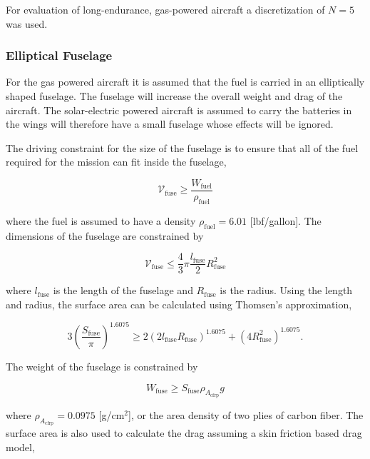     For evaluation of long-endurance, gas-powered aircraft a discretization of $N=5$ was used. 

\subsubsection{Elliptical Fuselage}

For the gas powered aircraft it is assumed that the fuel is carried in an elliptically shaped fuselage.  The fuselage will increase the overall weight and drag of the aircraft.  The solar-electric powered aircraft is assumed to carry the batteries in the wings will therefore have a small fuselage whose effects will be ignored.  

The driving constraint for the size of the fuselage is to ensure that all of the fuel required for the mission can fit inside the fuselage, 

\begin{equation}
    \label{e:fusevol}
    \mathcal{V}_{\text{fuse}} \geq \frac{W_\text{fuel}}{\rho_\text{fuel}}
\end{equation}

where the fuel is assumed to have a density $\rho_\text{fuel} = 6.01$ [lbf/gallon].  The dimensions of the fuselage are constrained by

\begin{equation}
    \label{e:fusevol2}
    \mathcal{V}_{\text{fuse}} \leq \frac{4}{3}\pi \frac{l_{\text{fuse}}}{2}R_{\text{fuse}}^2
\end{equation}

where $l_{\text{fuse}}$ is the length of the fuselage and $R_{\text{fuse}}$ is the radius. Using the length and radius, the surface area can be calculated using Thomsen's approximation,\cite{ellipsoidSA}

\begin{equation}
    \label{e:fusesa}
    3 \left( \frac{S_{\text{fuse}}}{\pi} \right)^{1.6075} \geq 2(2l_{\text{fuse}}R_{\text{fuse}})^{1.6075} + (4R_{\text{fuse}}^2)^{1.6075}.
\end{equation}

The weight of the fuselage is constrained by

\begin{equation}
    \label{e:fuseweight}
    W_{\text{fuse}} \geq S_{\text{fuse}} \rho_{A_{\text{cfrp}}} g
\end{equation} 

where $\rho_{A_{\text{cfrp}}} = 0.0975$ [g/cm$^2$], or the area density of two plies of carbon fiber.\cite{cfply}  The surface area is also used to calculate the drag assuming a skin friction based drag model,

